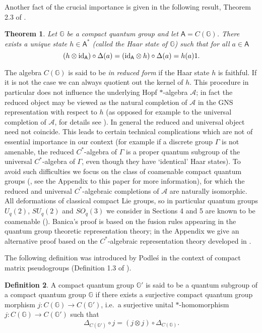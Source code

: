 \documentclass[12pt]{amsart}
\newtheorem{theorem}{Theorem}[section]
\theoremstyle{definition}
\newtheorem{definition}[theorem]{Definition}
\theoremstyle{remark}
\numberwithin{equation}{section}
\begin{document}
Another fact of the crucial importance is given in the following result, Theorem 2.3 of
\cite{woronowicz98}.

\begin{theorem} \label{prop-haar}
Let ${\mathbb{G}}$ be a compact quantum group and let ${\mathsf{A}}=C({\mathbb{G}})$. There exists a unique state $h \in {\mathsf{A}}^*$ (called the \emph{Haar state} of
${\mathbb{G}}$) such that for all $a \in \mathsf{A}$
\[
(h \otimes \textup{id}_{\mathsf{A}})\circ  \Delta (a) = ( \textup{id}_{\mathsf{A}} \otimes h)\circ  \Delta (a) = h(a) 1.
\]
\end{theorem}

 The algebra $C({\mathbb{G}})$ is said to be \emph{in reduced form} if the Haar state $h$ is faithful. If it is not the case we can
always quotient out the kernel of $h$. This procedure in particular does not influence the underlying Hopf 
$*$-algebra $\mathcal{A}$; in fact the reduced object may be viewed as the natural completion of $\mathcal{A}$ in 
the GNS representation with respect to $h$ (as opposed for example to the universal completion of $\mathcal{A}$, 
for details see \cite{bedos+murphy+tuset01}). In general the reduced and universal object need not coincide. This 
leads to certain technical complications which are not of essential importance in our context (for example if a 
discrete group $\Gamma$ is not amenable, the reduced $C^*$-algebra of $\Gamma$ is a proper quantum subgroup of 
the universal $C^*$-algebra of $\Gamma$, even though they have `identical' Haar states). To avoid such 
difficulties we focus on the class of coamenable compact quantum groups (\cite{bedos+murphy+tuset01}, see the 
Appendix to this paper for more information), for which the reduced and universal $C^*$-algebraic completions of 
$\mathcal{A}$ are naturally isomorphic. All deformations of classical compact Lie groups, so in particular 
quantum groups $U_q(2)$, $SU_q(2)$ and $SO_q(3)$ we consider in Sections 4 and 5 are known to be coamenable 
(\cite{Banica99}). Banica's proof is based on the fusion rules appearing in the quantum group theoretic 
representation theory; in the Appendix we give an alternative proof based on the $C^*$-algebraic representation 
theory developed in \cite{korogodski+soibelman98}.

The following definition was introduced by Podle\'s in the context of compact matrix pseudogroups (Definition 1.3 of
\cite{podles95}).

\begin{definition} A compact quantum group ${\mathbb{G}}'$ is said to be a quantum subgroup of
a compact quantum group ${\mathbb{G}}$ if there exists a surjective compact quantum group morphism  $j:C({\mathbb{G}}) \to C({\mathbb{G}}')$, i.e.\ a surjective
unital
$*$-homomorphism $j:C({\mathbb{G}}) \to C({\mathbb{G}}') $ such that
\begin{equation} \Delta_{C({\mathbb{G}}')}\circ j = (j \otimes j) \circ\Delta_{C({\mathbb{G}})}.\label{comor}\end{equation}
\end{definition}
\end{document}
